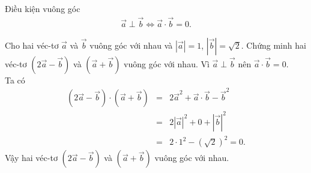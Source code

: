 \begin{dang}{Điều kiện vuông góc}
	\begin{eqnarray*}
		\overrightarrow{a}\perp\overrightarrow{b}\Leftrightarrow \overrightarrow{a}\cdot\overrightarrow{b}=0.
	\end{eqnarray*}
\end{dang}
\viduminhhoa
\begin{vd}%
	Cho hai véc-tơ $\overrightarrow{a}$ và $\overrightarrow{b}$ vuông góc với nhau và $\left |\overrightarrow{a} \right |=1$, $\left |\overrightarrow{b} \right |=\sqrt{2}$. Chứng minh hai véc-tơ $\left (2\overrightarrow{a}-\overrightarrow{b} \right )$ và $\left (\overrightarrow{a}+\overrightarrow{b} \right )$ vuông góc với nhau.
	\loigiai
	{
		Vì $\overrightarrow{a}\perp\overrightarrow{b}$ nên $\overrightarrow{a}\cdot\overrightarrow{b}=0$.\\
		Ta có
		\begin{eqnarray*}
			\left (2\overrightarrow{a}-\overrightarrow{b} \right )\cdot \left (\overrightarrow{a}+\overrightarrow{b} \right )&=&2\overrightarrow{a}^2+\overrightarrow{a}\cdot\overrightarrow{b}-\overrightarrow{b}^2\\&=&2\left |\overrightarrow{a} \right |^2+0+\left |\overrightarrow{b} \right |^2\\&=&2\cdot 1^2-\left (\sqrt{2} \right )^2=0.
		\end{eqnarray*}
		Vậy hai véc-tơ $\left (2\overrightarrow{a}-\overrightarrow{b} \right )$ và $\left (\overrightarrow{a}+\overrightarrow{b} \right )$ vuông góc với nhau.
	}
\end{vd}

